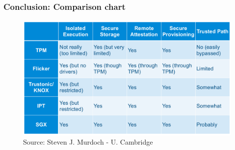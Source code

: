 \documentclass{beamer}
\begin{document}
\begin{frame}
    \frametitle{Conclusion: Comparison chart}

    \begin{figure}[htb]
        \centering
        \includegraphics[scale=.33]{assets/chart}
        \caption{Source: Steven J. Murdoch - U. Cambridge}
    \end{figure}
\end{frame}
\end{document}
